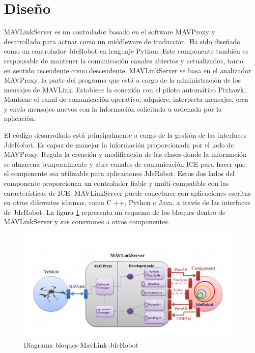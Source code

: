 \section{Diseño}
\label{Diseno}
MAVLinkServer es un controlador basado en el software MAVProxy y desarrollado para actuar como un middleware de traducción. Ha sido diseñado como un controlador JdeRobot en lenguaje Python. Este componente también es responsable de mantener la comunicación canales abiertos y actualizados, tanto en sentido ascendente como descendente. MAVLinkServer se basa en el analizador MAVProxy, la parte del programa que está a cargo de la administración de los mensajes de MAVLink. Establece la conexión con el piloto automático Pixhawk, Mantiene el canal de comunicación operativo, adquiere, interpreta mensajes, crea y envía mensajes nuevos con la información solicitada u ordenada por la aplicación.

El código desarrollado está principalmente a cargo de la gestión de las interfaces JdeRobot. Es capaz de manejar la información proporcionada por el lado de MAVProxy. Regula la creación y modificación de las clases donde la información se almacena temporalmente y abre canales de comunicación ICE para hacer que el componente sea utilizable para aplicaciones JdeRobot.
Estos dos lados del componente proporcionan un controlador fiable y multi-compatible con las características de ICE; MAVLinkServer puede conectarse con aplicaciones escritas en otros diferentes idiomas, como C ++, Python o Java, a través de las interfaces de JdeRobot. La figura \ref{fig:mavLinkJdeRobot} representa un esquema de los bloques dentro de MAVLinkServer y sus conexiones a otros componentes.

\begin{figure}[H]
  \centering
  \includegraphics[scale=0.65]{imagenes/DiagramaMavLinkJdeRobot.png}
  \caption{Diagrama bloques MavLink-JdeRobot}
  \label{fig:mavLinkJdeRobot}
\end{figure}

